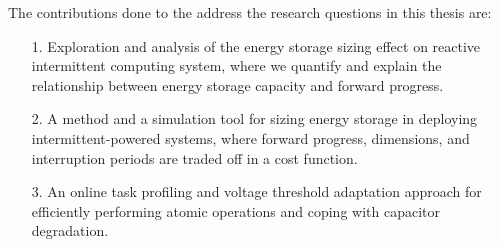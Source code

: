 The contributions done to the address the research questions in this thesis are:
\begin{itemize}
  \item[1.] Exploration and analysis of the energy storage sizing effect on reactive intermittent computing system, where we quantify and explain the relationship between energy storage capacity and forward progress.
  \item[2.] A method and a simulation tool for sizing energy storage in deploying intermittent-powered systems, where forward progress, dimensions, and interruption periods are traded off in a cost function.
  \item[3.] An online task profiling and voltage threshold adaptation approach for efficiently performing atomic operations and coping with capacitor degradation. 
\end{itemize}


